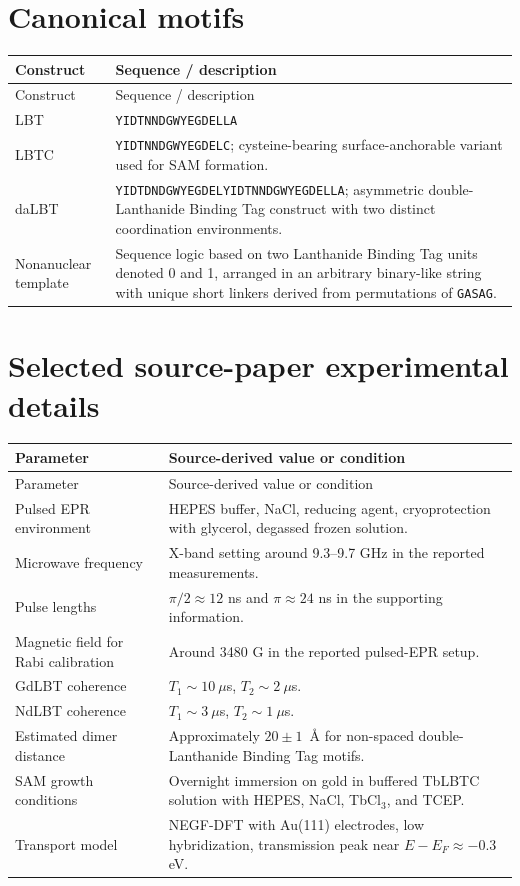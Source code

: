 \documentclass[11pt]{report}
\newcommand{\lbt}{Lanthanide Binding Tag}
\newcommand{\au}{Au(111)}
\theoremstyle{definition}
\begin{document}
\section{Canonical motifs}
\begin{longtable}{>{\raggedright\arraybackslash}p{3.0cm} >{\raggedright\arraybackslash}p{8.5cm}}
\toprule
Construct & Sequence / description \\
\midrule
\endfirsthead
\toprule
Construct & Sequence / description \\
\midrule
\endhead
LBT & \texttt{YIDTNNDGWYEGDELLA} \\
LBTC & \texttt{YIDTNNDGWYEGDELC}; cysteine-bearing surface-anchorable variant used for SAM formation. \\
daLBT & \texttt{YIDTDNDGWYEGDELYIDTNNDGWYEGDELLA}; asymmetric double-\lbt{} construct with two distinct coordination environments. \\
Nonanuclear template & Sequence logic based on two \lbt{} units denoted 0 and 1, arranged in an arbitrary binary-like string with unique short linkers derived from permutations of \texttt{GASAG}. \\
\bottomrule
\end{longtable}

\section{Selected source-paper experimental details}
\begin{longtable}{>{\raggedright\arraybackslash}p{4.1cm} >{\raggedright\arraybackslash}p{7.3cm}}
\toprule
Parameter & Source-derived value or condition \\
\midrule
\endfirsthead
\toprule
Parameter & Source-derived value or condition \\
\midrule
\endhead
Pulsed EPR environment & HEPES buffer, NaCl, reducing agent, cryoprotection with glycerol, degassed frozen solution. \\
Microwave frequency & X-band setting around 9.3--9.7 GHz in the reported measurements. \\
Pulse lengths & $\pi/2 \approx 12$ ns and $\pi \approx 24$ ns in the supporting information. \\
Magnetic field for Rabi calibration & Around 3480 G in the reported pulsed-EPR setup. \\
GdLBT coherence & $T_1 \sim 10~\mu$s, $T_2 \sim 2~\mu$s. \\
NdLBT coherence & $T_1 \sim 3~\mu$s, $T_2 \sim 1~\mu$s. \\
Estimated dimer distance & Approximately $20 \pm 1$~\AA{} for non-spaced double-\lbt{} motifs. \\
SAM growth conditions & Overnight immersion on gold in buffered TbLBTC solution with HEPES, NaCl, TbCl$_3$, and TCEP. \\
Transport model & NEGF-DFT with \au{} electrodes, low hybridization, transmission peak near $E-E_F \approx -0.3$ eV. \\
\bottomrule
\end{longtable}
\end{document}
